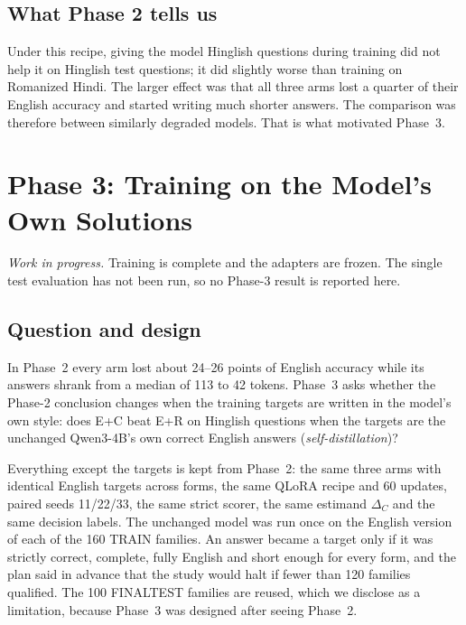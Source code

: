 \documentclass[12pt,a4paper,oneside]{report}
\renewcommand{\_}{\oldunderscore\allowbreak}
\begin{document}
\section{What Phase 2 tells us}

Under this recipe, giving the model Hinglish questions during training did not help it on Hinglish test questions; it did slightly worse than training on Romanized Hindi. The larger effect was that all three arms lost a quarter of their English accuracy and started writing much shorter answers. The comparison was therefore between similarly degraded models. That is what motivated Phase~3.

\chapter{Phase 3: Training on the Model's Own Solutions}
\label{ch:phase3}

\noindent\textit{Work in progress.} Training is complete and the adapters are frozen. The single test evaluation has not been run, so no Phase-3 result is reported here.

\section{Question and design}

In Phase~2 every arm lost about 24--26 points of English accuracy while its answers shrank from a median of 113 to 42 tokens. Phase~3 asks whether the Phase-2 conclusion changes when the training targets are written in the model's own style: does E+C beat E+R on Hinglish questions when the targets are the unchanged Qwen3-4B's own correct English answers (\emph{self-distillation})?

Everything except the targets is kept from Phase~2: the same three arms with identical English targets across forms, the same QLoRA recipe and 60 updates, paired seeds 11/22/33, the same strict scorer, the same estimand $\Delta_C$ and the same decision labels. The unchanged model was run once on the English version of each of the 160 TRAIN families. An answer became a target only if it was strictly correct, complete, fully English and short enough for every form, and the plan said in advance that the study would halt if fewer than 120 families qualified. The 100 FINAL\_TEST families are reused, which we disclose as a limitation, because Phase~3 was designed after seeing Phase~2.
\end{document}
